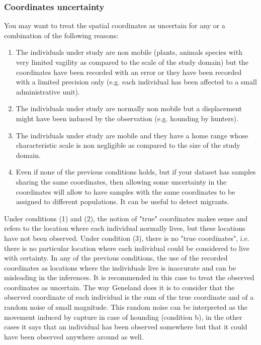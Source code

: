 \documentclass{article}
\begin{document}
\subsubsection{Coordinates uncertainty}\label{sec:uncertainty}


You may want to treat the spatial coordinates as uncertain for any or a combination of the following reasons:
\begin{enumerate}
\item The individuals under study are non mobile (plants, animals species with very limited vagility as compared 
to the scale of the study domain) but the coordinates have been recorded with an error or they have been recorded 
with a limited precision only (e.g.  each individual has been affected to a small administrative unit).
\item The individuals under study are normally non mobile but a displacement might have been induced by the observation 
(e.g. hounding by hunters).
\item The individuals under study are mobile and they have a home range whose characteristic scale is non negligible 
as compared to the size of the study domain.
\item Even if none of the previous conditions  holds, but if your dataset has samples sharing the same coordinates, 
then allowing some uncertainty in the coordinates will allow to have samples with the same coordinates 
to be assigned to different populations. It can be useful to detect migrants. 
\end{enumerate}


Under conditions (1) and (2), the notion of "true" coordinates makes sense and refers to the location where each  
individual normally lives, but these locations have not been observed.
Under condition (3),  there is no "true coordinates", i.e. there is no particular location where each individual could 
be considered to live with certainty.
In  any of the previous conditions, the use of the recorded coordinates as locations where the individuals live
is inaccurate and can be misleading in the inferences.
It is recommended in this case to treat the observed coordinates as uncertain. The way {\sc Geneland} does it is to consider 
that the observed coordinate of each individual is the sum of the true coordinate and of a random noise of small magnitude. 
This random noise can be interpreted as the movement induced by capture in case of hounding (condition b), in the other cases 
it says that an individual has been observed somewhere but that it could have been observed anywhere around as well.
\end{document}
